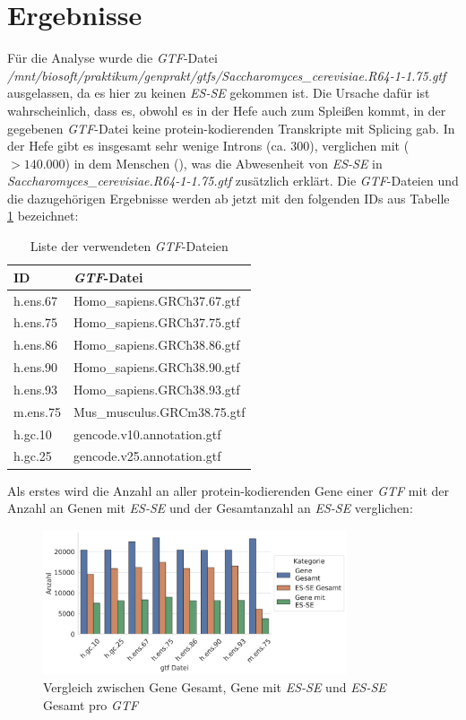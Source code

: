 \documentclass[12pt]{article}
\begin{document}
\section{Ergebnisse}\label{sec:res}
Für die Analyse wurde die \textit{GTF}-Datei \textit{/mnt/biosoft/praktikum/genprakt/gtfs/Saccharomyces\_cerevisiae.R64-1-1.75.gtf} ausgelassen,
da es hier zu keinen \textit{ES-SE} gekommen ist. Die Ursache dafür ist wahrscheinlich, dass
es, obwohl es in der Hefe auch zum Splei\ss en kommt, in der gegebenen \textit{GTF}-Datei keine protein-kodierenden Transkripte mit
Splicing gab.
In der Hefe gibt es insgesamt sehr wenige Introns (ca. 300), verglichen mit ($> 140.000$) in dem Menschen (\cite[p.~1525]{doi:10.1073/pnas.0610354104}),
was die Abwesenheit von \textit{ES-SE} in \textit{Saccharomyces\_cerevisiae.R64-1-1.75.gtf} zusätzlich erklärt.
Die \textit{GTF}-Dateien und die dazugehörigen Ergebnisse werden ab jetzt mit den folgenden IDs aus Tabelle
\ref{tab:label} bezeichnet:

\begin{table}[htpb]
	\centering
	\caption{Liste der verwendeten \textit{GTF}-Dateien}
	\label{tab:label}
	\begin{tabular}{l|l}
		\textbf{ID} & \textbf{\textit{GTF}-Datei} \\ \hline
		h.ens.67    & Homo\_sapiens.GRCh37.67.gtf \\
		h.ens.75    & Homo\_sapiens.GRCh37.75.gtf \\
		h.ens.86    & Homo\_sapiens.GRCh38.86.gtf \\
		h.ens.90    & Homo\_sapiens.GRCh38.90.gtf \\
		h.ens.93    & Homo\_sapiens.GRCh38.93.gtf \\
		m.ens.75    & Mus\_musculus.GRCm38.75.gtf \\
		h.gc.10     & gencode.v10.annotation.gtf  \\
		h.gc.25     & gencode.v25.annotation.gtf  \\
	\end{tabular}
\end{table}


Als erstes wird die Anzahl an aller protein-kodierenden Gene einer \textit{GTF} mit der Anzahl an Genen mit \textit{ES-SE} und der Gesamtanzahl an \textit{ES-SE}
verglichen:

\begin{figure}[htpb]
	\centering
	\includegraphics[width=0.8\textwidth]{./plots/genes.jpg}
	\caption{Vergleich zwischen Gene Gesamt, Gene mit \textit{ES-SE} und \textit{ES-SE} Gesamt pro \textit{GTF}}
	\label{fig:-plots-genes-jpg}
\end{figure}
\end{document}

